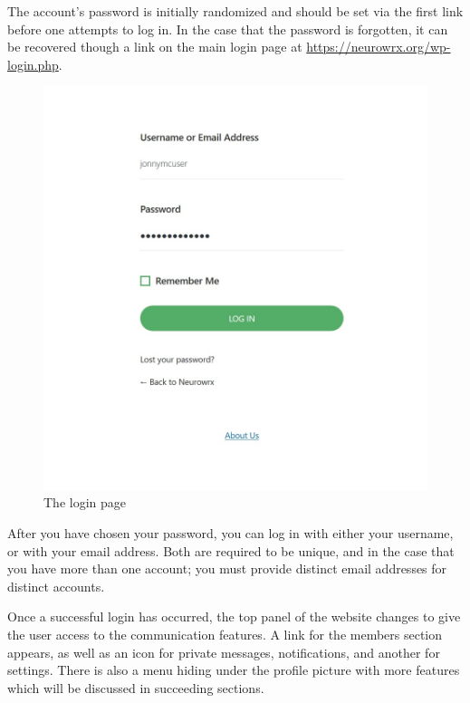 \documentclass[10pt]{article}
\begin{document}
The account's password is initially randomized and should be set via the first link before one attempts to log in.  In the case that the password is forgotten, it can be recovered though a link on the main login page at \url{https://neurowrx.org/wp-login.php}.

\begin{figure}[h]
    \centering
    \includegraphics[scale=0.3]{images/loginpage.jpg}
    \caption{The login page}
    \label{loginpage}
\end{figure}

\begin{flushleft}
After you have chosen your password, you can log in with either your username, or with your email address.  Both are required to be unique, and in the case that you have more than one account; you must provide distinct email addresses for distinct accounts. 
\end{flushleft}

\begin{flushleft}
Once a successful login has occurred, the top panel of the website changes to give the user access to the communication features.  A link for the members section appears, as well as an icon for private messages, notifications, and another for settings.  There is also a menu hiding under the profile picture with more features which will be discussed in succeeding sections. 
\end{flushleft}
\end{document}
